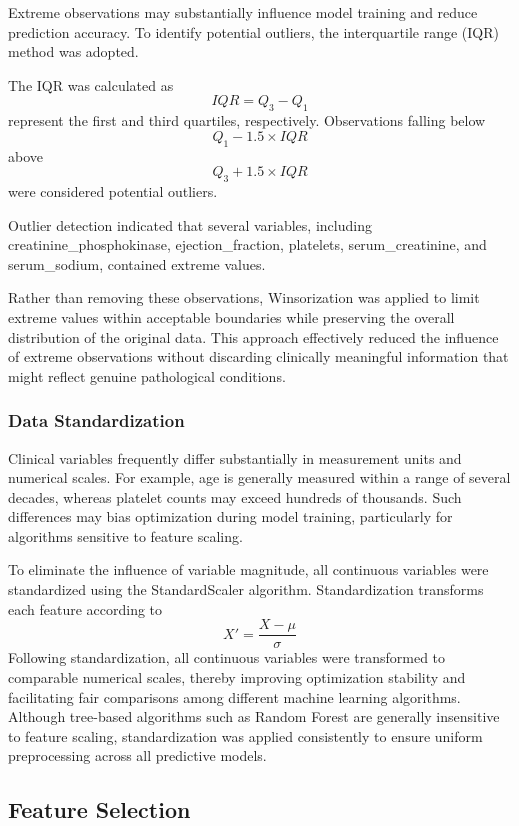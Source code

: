 \documentclass[12pt]{article}
\begin{document}
Extreme observations may substantially influence model training and reduce prediction accuracy. To identify potential outliers, the interquartile range (IQR) method was adopted.

The IQR was calculated as
\[
IQR = Q_3 - Q_1
\]
represent the first and third quartiles, respectively. Observations falling below
\[
Q_1 - 1.5 \times IQR
\]
above
\[
Q_3 + 1.5 \times IQR
\]
were considered potential outliers.

Outlier detection indicated that several variables, including creatinine\_phosphokinase, ejection\_fraction, platelets, serum\_creatinine, and serum\_sodium, contained extreme values.

Rather than removing these observations, Winsorization was applied to limit extreme values within acceptable boundaries while preserving the overall distribution of the original data. This approach effectively reduced the influence of extreme observations without discarding clinically meaningful information that might reflect genuine pathological conditions. 

\subsubsection{Data Standardization}

Clinical variables frequently differ substantially in measurement units and numerical scales. For example, age is generally measured within a range of several decades, whereas platelet counts may exceed hundreds of thousands. Such differences may bias optimization during model training, particularly for algorithms sensitive to feature scaling.

To eliminate the influence of variable magnitude, all continuous variables were standardized using the StandardScaler algorithm. Standardization transforms each feature according to
\[
X'=\frac{X-\mu}{\sigma}
\]
Following standardization, all continuous variables were transformed to comparable numerical scales, thereby improving optimization stability and facilitating fair comparisons among different machine learning algorithms. Although tree-based algorithms such as Random Forest are generally insensitive to feature scaling, standardization was applied consistently to ensure uniform preprocessing across all predictive models. 

 

\subsection{Feature Selection}
\end{document}
